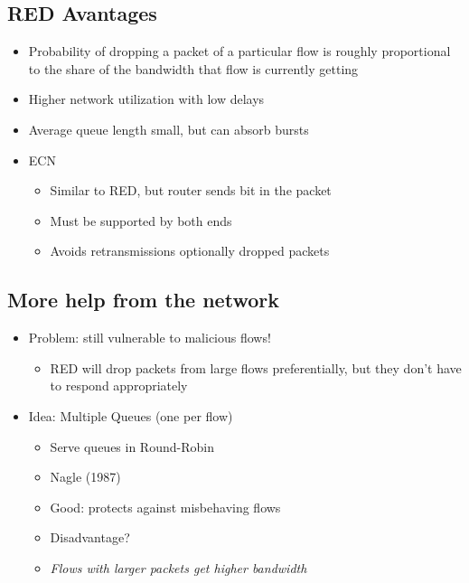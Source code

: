 \subsection{RED Avantages}
\begin{itemize}[nosep]
    \item Probability of dropping a packet of a particular flow is roughly proportional to the share of the bandwidth that flow is currently getting
    \item Higher network utilization with low delays
    \item Average queue length small, but can absorb bursts
    \item ECN
          \begin{itemize}[nosep]
              \item Similar to RED, but router sends bit in the packet
              \item Must be supported by both ends
              \item Avoids retransmissions optionally dropped packets
          \end{itemize}
\end{itemize}
\subsection{More help from the network}
\begin{itemize}[nosep]
    \item Problem: still vulnerable to malicious flows!
          \begin{itemize}[nosep]
              \item RED will drop packets from large flows preferentially, but they don't have to respond appropriately
          \end{itemize}
    \item Idea: Multiple Queues (one per flow)
          \begin{itemize}[nosep]
              \item Serve queues in Round-Robin
              \item Nagle (1987)
              \item Good: protects against misbehaving flows
              \item Disadvantage?
              \item \emph{Flows with larger packets get higher bandwidth}
          \end{itemize}
\end{itemize}
